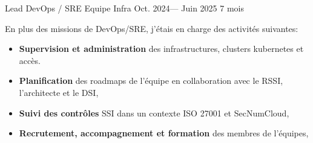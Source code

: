 \jobposition%
{Lead DevOps / SRE}%
{Equipe Infra}%
{Oct. 2024--- Juin 2025}%
{7 mois}%
{
  En plus des missions de DevOps/SRE, j'étais en charge des activités suivantes:
	\begin{itemize}
		\item \textbf{Supervision et administration} des
		      infrastructures, clusters kubernetes et accès.
		\item \textbf{Planification} des roadmaps de l'équipe en collaboration avec
		      le RSSI, l'architecte et le DSI,
		\item \textbf{Suivi des contrôles} SSI dans un contexte ISO 27001 et SecNumCloud,
		\item \textbf{Recrutement, accompagnement et formation} des membres de
		      l'équipes,
	\end{itemize}
}
